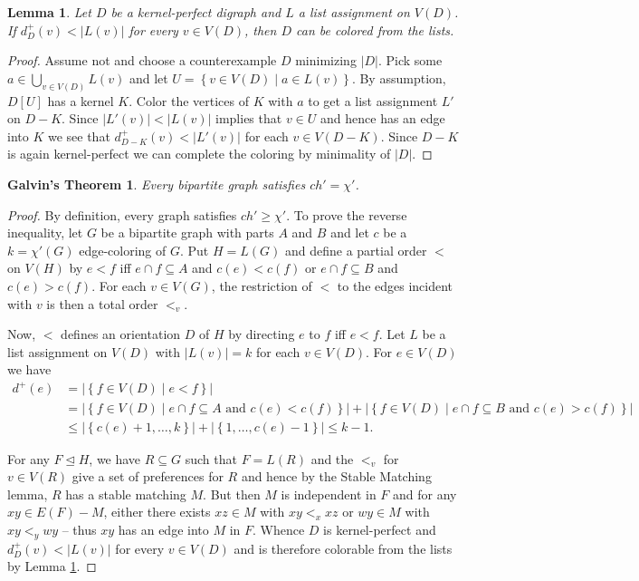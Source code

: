 \documentclass[12pt]{article}
\theoremstyle{plain}
\newtheorem{lem}[thm]{Lemma}
\newtheorem*{Galvin}{Galvin's Theorem}
\theoremstyle{definition}
\theoremstyle{remark}
\newcommand{\set}[1]{\left\{ #1 \right\}}
\newcommand{\setb}[3]{\left\{ #1 \in #2 \mid #3 \right\}}
\newcommand{\card}[1]{\left|#1\right|}
\begin{document}
\begin{lem}\label{KernelColoring}
Let $D$ be a kernel-perfect digraph and $L$ a list assignment on $V(D)$.  If $d_D^+(v) < \card{L(v)}$ for every $v \in V(D)$, then $D$ can be colored from the lists.
\end{lem}
\begin{proof}
Assume not and choose a counterexample $D$ minimizing $\card{D}$.  Pick some $a \in \bigcup_{v \in V(D)} L(v)$ and let $U = \setb{v}{V(D)}{a \in L(v)}$.  By assumption, $D[U]$ has a kernel $K$.  Color the vertices of $K$ with $a$ to get a list assignment $L'$ on $D - K$.  Since $\card{L'(v)} < \card{L(v)}$ implies that $v \in U$ and hence has an edge into $K$ we see that $d_{D - K}^+(v) < \card{L'(v)}$ for each $v \in V(D - K)$.  Since $D - K$ is again kernel-perfect we can complete the coloring by minimality of $\card{D}$.
\end{proof}

\begin{Galvin}
Every bipartite graph satisfies $ch' = \chi'$.
\end{Galvin}
\begin{proof}
By definition, every graph satisfies $ch' \geq \chi'$.  To prove the reverse inequality, let $G$ be a bipartite graph with parts $A$ and $B$ and let $c$ be a $k = \chi'(G)$ edge-coloring of $G$.  Put $H = L(G)$ and define a partial order $<$ on $V(H)$ by $e < f$ iff $e \cap f \subseteq A$ and $c(e) < c(f)$ or $e \cap f \subseteq B$ and $c(e) > c(f)$.  For each $v \in V(G)$, the restriction of $<$ to the edges incident with $v$ is then a total order $<_v$.  

Now, $<$ defines an orientation $D$ of $H$ by directing $e$ to $f$ iff $e < f$.  Let $L$ be a list assignment on $V(D)$ with $\card{L(v)} = k$ for each $v \in V(D)$.  For $e \in V(D)$ we have 
\begin{align*}
d^+(e) &= \card{\setb{f}{V(D)}{e < f}} \\
&= \card{\setb{f}{V(D)}{e \cap f \subseteq A \text{ and } c(e) < c(f)}} + \card{\setb{f}{V(D)}{e \cap f \subseteq B \text{ and } c(e) > c(f)}} \\
&\leq \card{\set{c(e) + 1, \ldots, k}} + \card{\set{1, \ldots, c(e) - 1}} \leq k-1.
\end{align*}

For any $F \unlhd H$, we have $R \subseteq G$ such that $F = L(R)$ and the $<_v$ for $v \in V(R)$ give a set of preferences for $R$ and hence by the Stable Matching lemma, $R$ has a stable matching $M$.  But then $M$ is independent in $F$ and for any $xy \in E(F) - M$, either there exists $xz \in M$ with $xy <_x xz$ or $wy \in M$ with $xy <_y wy$ -- thus $xy$ has an edge into $M$ in $F$.  Whence $D$ is kernel-perfect and $d_D^+(v) < \card{L(v)}$ for every $v \in V(D)$ and is therefore colorable from the lists by Lemma \ref{KernelColoring}.
\end{proof}
\end{document}

